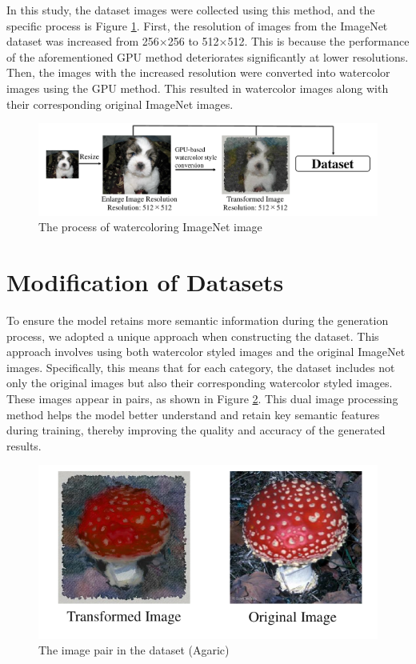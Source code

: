 \documentclass[12pt]{report}
\begin{document}
In this study, the dataset images were collected using this method, and the specific process is Figure \ref{fig:gpu}. First, the resolution of images from the ImageNet dataset was increased from 256$\times$256 to 512$\times$512. This is because the performance of the aforementioned GPU method deteriorates significantly at lower resolutions. Then, the images with the increased resolution were converted into watercolor images using the GPU method. This resulted in watercolor images along with their corresponding original ImageNet images.

\begin{figure}[h]
    \centering
    \includegraphics[width=16cm]{image/gpu.pdf}
    \caption{The process of watercoloring ImageNet image}
    \label{fig:gpu}
\end{figure}

\section{Modification of Datasets}
To ensure the model retains more semantic information during the generation process, we adopted a unique approach when constructing the dataset. This approach involves using both watercolor styled images and the original ImageNet images. Specifically, this means that for each category, the dataset includes not only the original images but also their corresponding watercolor styled images. These images appear in pairs, as shown in Figure \ref{fig:pairs}. This dual image processing method helps the model better understand and retain key semantic features during training, thereby improving the quality and accuracy of the generated results.

\begin{figure}[h]
    \centering
    \includegraphics[width=14cm]{image/pairs.pdf}
    \caption{The image pair in the dataset (Agaric)}
    \label{fig:pairs}
\end{figure}
\end{document}
